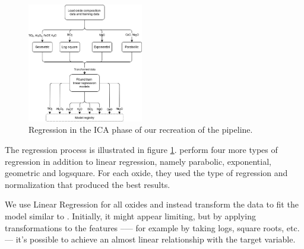 \begin{figure}
	\centering
	\includegraphics[width=0.45\textwidth]{images/ica_regression.png}
	\caption{Regression in the ICA phase of our recreation of the pipeline.}
	\label{fig:ica_regression}
\end{figure}

The regression process is illustrated in figure \ref{fig:ica_regression}.
\citet{cleggRecalibrationMarsScience2017} perform four more types of regression in addition to linear regression, namely parabolic, exponential, geometric and logsquare.
For each oxide, they used the type of regression and normalization that produced the best results.

We use Linear Regression for all oxides and instead transform the data to fit the model similar to \citet{kuo_detecting_2018}.
Initially, it might appear limiting, but by applying transformations to the features --— for example by taking logs, square roots, etc. --- it's possible to achieve an almost linear relationship with the target variable.




